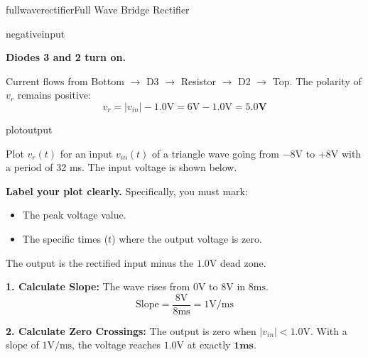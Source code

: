 \begin{mainquestion}{fullwaverectifier}{Full Wave Bridge Rectifier}
\begin{partquestion}{negativeinput}
\begin{answer}[1.5in]
        \textbf{Diodes 3 and 2 turn on.}
        
        Current flows from Bottom $\to$ D3 $\to$ Resistor $\to$ D2 $\to$ Top.
        The polarity of $v_r$ remains positive:
        \[ v_r = |v_{in}| - 1.0\text{V} = 6\text{V} - 1.0\text{V} = \mathbf{5.0\text{V}} \]
\end{answer}

    \pagebreak
\end{partquestion}

\begin{partquestion}{plotoutput}
{Plot $v_r(t)$ for an input $v_{in}(t)$ of a triangle wave going from $-8\text{V}$ to $+8\text{V}$ with a period of 32 ms. The input voltage is shown below.
    
    \textbf{Label your plot clearly.} Specifically, you must mark:
    \begin{itemize}
        \item The peak voltage value.
        \item The specific times ($t$) where the output voltage is zero.
    \end{itemize}

    \begin{center}
    \end{center}}

\begin{answer}[3.5in]
        The output is the rectified input minus the $1.0\text{V}$ dead zone.
        
        \textbf{1. Calculate Slope:}
        The wave rises from $0\text{V}$ to $8\text{V}$ in $8\text{ms}$.
        \[ \text{Slope} = \frac{8\text{V}}{8\text{ms}} = 1\text{V/ms} \]
        
        \textbf{2. Calculate Zero Crossings:}
        The output is zero when $|v_{in}| < 1.0\text{V}$.
        With a slope of $1\text{V/ms}$, the voltage reaches $1.0\text{V}$ at exactly $\mathbf{1\text{ms}}$.
        

\end{answer}
\end{partquestion}
\end{mainquestion}

